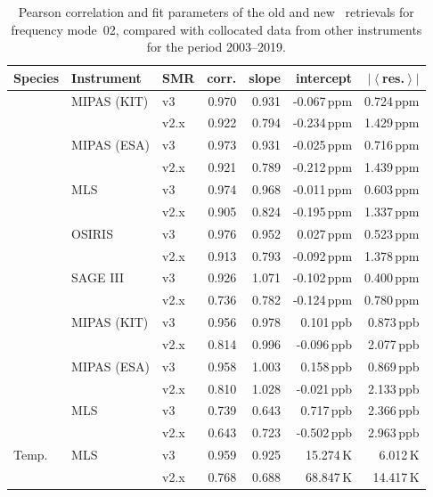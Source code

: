 \begin{table}[tbhp]
\centering
\caption{Pearson correlation and fit parameters of the old and new \smr\
retrievals for frequency mode~02, compared with collocated data from other
instruments for the period 2003--2019.
}
\label{tab:fm02:stats}
\begin{tabular}{lllrrrr}
    \toprule
    \textbf{Species} & \textbf{Instrument} & \textbf{SMR} & \textbf{corr.} & \textbf{slope} & \textbf{intercept} & \textbf{$\left|\left<\right.\right.$res.$\left.\left.\right>\right|$} \\
    \midrule
    \chem{O3}       & MIPAS (KIT)   & v3    & 0.970 & 0.931 & -0.067\,ppm   & 0.724\,ppm \\
                    &               & v2.x  & 0.922 & 0.794 & -0.234\,ppm   & 1.429\,ppm \\
    \cline{2-7}
                    & MIPAS (ESA)   & v3    & 0.973 & 0.931 & -0.025\,ppm   & 0.716\,ppm \\
                    &               & v2.x  & 0.921 & 0.789 & -0.212\,ppm   & 1.439\,ppm \\
    \cline{2-7}
                    & MLS           & v3    & 0.974 & 0.968 & -0.011\,ppm   & 0.603\,ppm \\
                    &               & v2.x  & 0.905 & 0.824 & -0.195\,ppm   & 1.337\,ppm \\
    \cline{2-7}
                    & OSIRIS        & v3    & 0.976 & 0.952 &  0.027\,ppm   & 0.523\,ppm \\
                    &               & v2.x  & 0.913 & 0.793 & -0.092\,ppm   & 1.378\,ppm \\
    \cline{2-7}
                    & SAGE III      & v3    & 0.926 & 1.071 & -0.102\,ppm   & 0.400\,ppm \\
                    &               & v2.x  & 0.736 & 0.782 & -0.124\,ppm   & 0.780\,ppm \\
    \midrule
    \chem{HNO_3}    & MIPAS (KIT)   & v3    & 0.956 & 0.978 &  0.101\,ppb   & 0.873\,ppb \\
                    &               & v2.x  & 0.814 & 0.996 & -0.096\,ppb   & 2.077\,ppb \\
    \cline{2-7}
                    & MIPAS (ESA)   & v3    & 0.958 & 1.003 &  0.158\,ppb   & 0.869\,ppb \\
                    &               & v2.x  & 0.810 & 1.028 & -0.021\,ppb   & 2.133\,ppb \\
    \cline{2-7}
                    & MLS           & v3    & 0.739 & 0.643 &  0.717\,ppb   & 2.366\,ppb \\
                    &               & v2.x  & 0.643 & 0.723 & -0.502\,ppb   & 2.963\,ppb \\
    \midrule
    Temp.           & MLS           & v3    & 0.959 & 0.925 & 15.274\,K     &  6.012\,K \\
                    &               & v2.x  & 0.768 & 0.688 & 68.847\,K     & 14.417\,K \\
    \bottomrule
\end{tabular}
\end{table}

